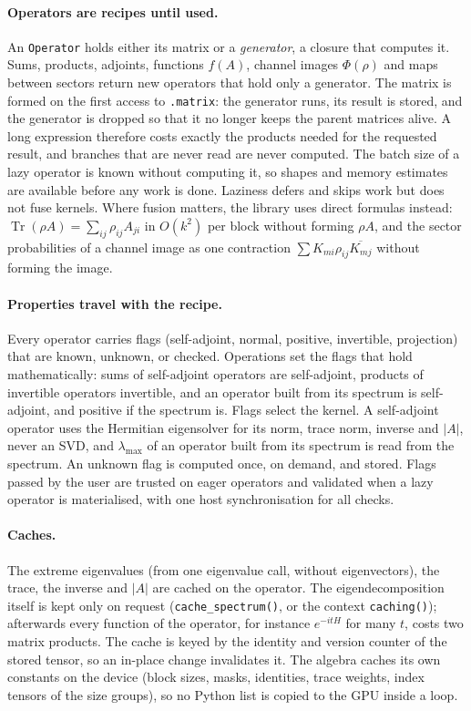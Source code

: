 \documentclass[11pt]{article}
\DeclareMathOperator{\Tr}{Tr}
\begin{document}
\paragraph{Operators are recipes until used.} An \texttt{Operator} holds either its matrix or a \emph{generator}, a
closure that computes it. Sums, products, adjoints, functions $f(A)$, channel images $\Phi(\rho)$ and maps between
sectors return new operators that hold only a generator. The matrix is formed on the first access to
\texttt{.matrix}: the generator runs, its result is stored, and the generator is dropped so that it no longer keeps the
parent matrices alive. A long expression therefore costs exactly the products needed for the requested result, and
branches that are never read are never computed. The batch size of a lazy operator is known without computing it, so
shapes and memory estimates are available before any work is done. Laziness defers and skips work but does not fuse
kernels. Where fusion matters, the library uses direct formulas instead: $\Tr(\rho A)=\sum_{ij}\rho_{ij}A_{ji}$ in
$O(k^2)$ per block without forming $\rho A$, and the sector probabilities of a channel image as one contraction
$\sum K_{mi}\rho_{ij}\overline{K_{mj}}$ without forming the image.

\paragraph{Properties travel with the recipe.} Every operator carries flags (self-adjoint, normal, positive,
invertible, projection) that are known, unknown, or checked. Operations set the flags that hold mathematically: sums of
self-adjoint operators are self-adjoint, products of invertible operators invertible, and an operator built from its
spectrum is self-adjoint, and positive if the spectrum is. Flags select the kernel. A self-adjoint operator uses the
Hermitian eigensolver for its norm, trace norm, inverse and $|A|$, never an SVD, and $\lambda_{\max}$ of an operator
built from its spectrum is read from the spectrum. An unknown flag is computed once, on demand, and stored. Flags passed
by the user are trusted on eager operators and validated when a lazy operator is materialised, with one host
synchronisation for all checks.

\paragraph{Caches.} The extreme eigenvalues (from one eigenvalue call, without eigenvectors), the trace, the inverse
and $|A|$ are cached on the operator. The eigendecomposition itself is kept only on request (\texttt{cache\_spectrum()},
or the context \texttt{caching()}); afterwards every function of the operator, for instance $e^{-itH}$ for many $t$,
costs two matrix products. The cache is keyed by the identity and version counter of the stored tensor, so an in-place
change invalidates it. The algebra caches its own constants on the device (block sizes, masks, identities, trace
weights, index tensors of the size groups), so no Python list is copied to the GPU inside a loop.
\end{document}
